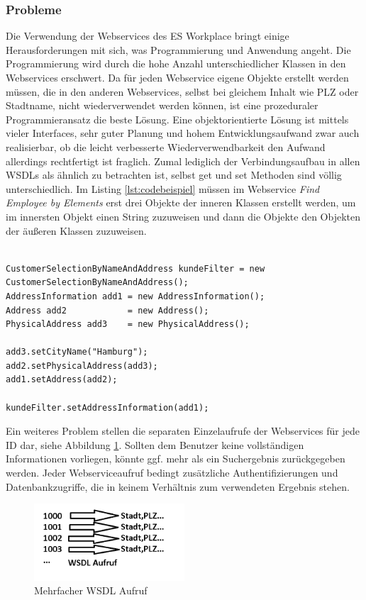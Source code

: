 \subsubsection{Probleme}

Die Verwendung der Webservices des ES Workplace bringt einige Herausforderungen mit sich, was Programmierung und Anwendung
angeht. Die Programmierung wird durch die hohe Anzahl unterschiedlicher Klassen in den Webservices erschwert. Da für jeden
Webservice eigene Objekte erstellt werden müssen, die in den anderen Webservices, selbst bei gleichem Inhalt wie PLZ oder
Stadtname, nicht wiederverwendet werden können, ist eine prozeduraler Programmieransatz die beste Lösung. Eine objektorientierte 
Lösung ist mittels vieler Interfaces, sehr guter Planung und hohem Entwicklungsaufwand zwar auch realisierbar, ob die leicht 
verbesserte Wiederverwendbarkeit den Aufwand allerdings rechtfertigt ist fraglich. Zumal lediglich der Verbindungsaufbau in allen
WSDLs als ähnlich zu betrachten ist, selbst get und set Methoden sind völlig unterschiedlich. Im Listing \ref{lst:codebeispiel}
müssen im Webservice \emph{Find Employee by Elements} erst drei Objekte der inneren Klassen erstellt werden, um im  innersten Objekt 
einen String zuzuweisen und dann die Objekte den Objekten der äußeren Klassen zuzuweisen.

\begin{lstlisting}[float=h!t]

CustomerSelectionByNameAndAddress kundeFilter = new CustomerSelectionByNameAndAddress();
AddressInformation add1 = new AddressInformation();
Address add2            = new Address();
PhysicalAddress add3    = new PhysicalAddress();

add3.setCityName("Hamburg");
add2.setPhysicalAddress(add3);
add1.setAddress(add2);

kundeFilter.setAddressInformation(add1);

\end{lstlisting} 


Ein weiteres Problem stellen die separaten Einzelaufrufe der Webservices für jede ID dar, siehe Abbildung \ref{fig:sapbild1}. Sollten dem Benutzer keine
vollständigen Informationen vorliegen, könnte ggf. mehr als ein Suchergebnis zurückgegeben werden. Jeder Webserviceaufruf bedingt 
zusätzliche Authentifizierungen und Datenbankzugriffe, die in keinem Verhältnis zum verwendeten Ergebnis stehen.
\begin{figure}[h!t]
\begin{center}
\includegraphics[width=0.5\textwidth]{Bilder/presi1.png}
\end{center}
\caption{Mehrfacher WSDL Aufruf}
\label{fig:sapbild1} 
\end{figure}

